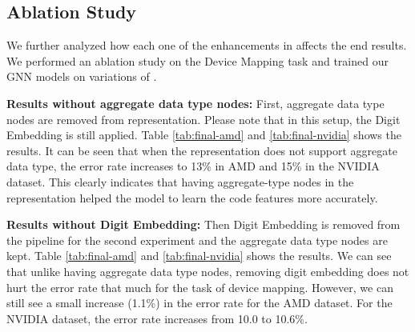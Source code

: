 \subsection{Ablation Study}

We further analyzed how each one of the enhancements in \ourtool affects the end results. We performed an ablation study on the Device Mapping task and trained our GNN models on variations of \ourtool.

\textbf{Results without aggregate data type nodes:}
First, aggregate data type nodes are removed from  \ourtool representation.
Please note that in this setup, the Digit Embedding is still applied. Table \ref{tab:final-amd} and \ref{tab:final-nvidia} shows the results. It can be seen that when the representation does not support aggregate data type, the error rate increases to 13\% in AMD and 15\% in the NVIDIA dataset. This clearly indicates that having aggregate-type nodes in the representation helped the model to learn the code features more accurately.

\textbf{Results without Digit Embedding:}
Then Digit Embedding is removed from the pipeline for the second experiment and the aggregate data type nodes are kept. Table \ref{tab:final-amd} and \ref{tab:final-nvidia} shows the results. We can see that unlike having aggregate data type nodes, removing digit embedding does not hurt the error rate that much for the task of device mapping. However, we can still see a small increase (1.1\%) in the error rate for the AMD dataset. For the NVIDIA dataset, the error rate increases from 10.0 to 10.6\%.


